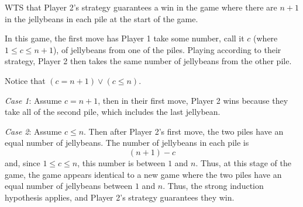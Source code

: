 WTS that Player 2's strategy guarantees a win in the game where
there are $n+1$ in the jellybeans in each pile at the start of the game.

In this game, the first move has Player 1 take 
some number, call it $c$ (where $1 \leq c \leq n+1$),
of jellybeans from one of the piles. 
Playing according to their strategy, Player 2 then 
takes the same number of jellybeans from  the other pile.

Notice that $(c = n+1) \lor (c \leq n)$.

{\it Case 1}: Assume $c = n+1$, then in their first move, 
Player 2 wins because they take all of the second pile, which 
includes the last jellybean.

{\it Case 2}: Assume $c \leq n$. Then after Player 2's first move,
the two piles have an equal number of jellybeans. The number
of jellybeans in each pile is 
\[
    (n+1) - c
\]
and, since $1 \leq c \leq n$, this number is between $1$ and $n$.
Thus, at this stage of the game, the game appears identical to a new 
game where the two piles have an equal number of jellybeans between $1$
and $n$. Thus, the strong induction hypothesis applies, and Player 2's
strategy guarantees they win.

